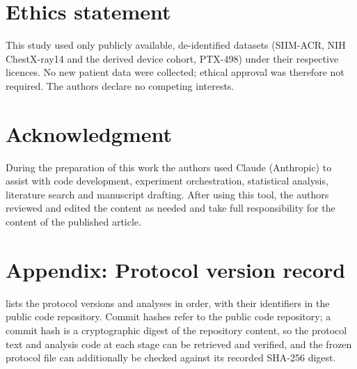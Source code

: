\documentclass{ieeeaccess}
\begin{document}
\section*{Ethics statement}
This study used only publicly available, de-identified datasets (SIIM-ACR, NIH ChestX-ray14 and the derived device cohort, PTX-498) under their respective licences. No new patient data were collected; ethical approval was therefore not required. The authors declare no competing interests.

\section*{Acknowledgment}
During the preparation of this work the authors used Claude (Anthropic) to assist with code development, experiment orchestration, statistical analysis, literature search and manuscript drafting. After using this tool, the authors reviewed and edited the content as needed and take full responsibility for the content of the published article.

\section*{Appendix: Protocol version record}
 lists the protocol versions and analyses in order, with their identifiers in the public code repository. Commit hashes refer to the public code repository; a commit hash is a cryptographic digest of the repository content, so the protocol text and analysis code at each stage can be retrieved and verified, and the frozen protocol file can additionally be checked against its recorded SHA-256 digest.
\end{document}
